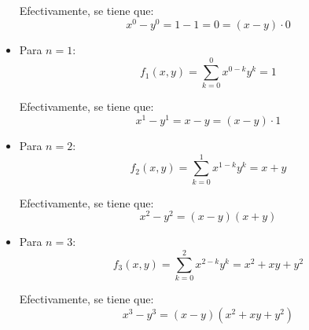 \documentclass[12pt]{article}
\begin{document}
\begin{ejercicio}[Inducción]
\begin{itemize}
                    Efectivamente, se tiene que:
                    \begin{equation*}
                        x^0 - y^0 = 1 - 1 = 0 = (x-y)\cdot 0
                    \end{equation*}
                \item Para $n=1$:
                    \begin{equation*}
                        f_1(x, y) = \sum_{k=0}^{0}x^{0-k}y^k = 1
                    \end{equation*}

                    Efectivamente, se tiene que:
                    \begin{equation*}
                        x^1 - y^1 = x - y = (x-y)\cdot 1
                    \end{equation*}
                \item Para $n=2$:
                    \begin{equation*}
                        f_2(x, y) = \sum_{k=0}^{1}x^{1-k}y^k = x + y
                    \end{equation*}

                    Efectivamente, se tiene que:
                    \begin{equation*}
                        x^2 - y^2 = (x-y)(x+y)
                    \end{equation*}
                \item Para $n=3$:
                    \begin{equation*}
                        f_3(x, y) = \sum_{k=0}^{2}x^{2-k}y^k = x^2 + xy + y^2
                    \end{equation*}

                    Efectivamente, se tiene que:
                    \begin{equation*}
                        x^3 - y^3 = (x-y)(x^2 + xy + y^2)
                    \end{equation*}
            \end{itemize}\newpage


\end{ejercicio}
\end{document}

